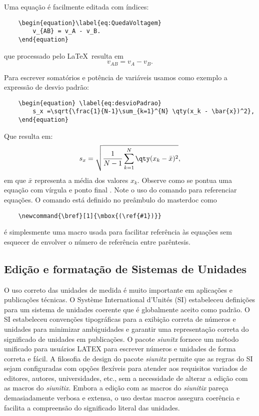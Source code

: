 Uma equação é facilmente editada com índices:
\begin{verbatim}
	\begin{equation}\label{eq:QuedaVoltagem}
		v_{AB} = v_A - v_B. 
	\end{equation}
\end{verbatim}

que processado pelo \LaTeX \, resulta em
\begin{equation}\label{eq:QuedaVoltagem}
	v_{AB} = v_A - v_B. 
\end{equation}

Para escrever  somatórios e potência de variáveis usamos como exemplo a expressão de desvio padrão: 
\begin{verbatim}
	\begin{equation} \label{eq:desvioPadrao}
		s_x =\sqrt{\frac{1}{N-1}\sum_{k=1}^{N} \qty(x_k - \bar{x})^2},
	\end{equation}
\end{verbatim}

Que resulta em:
\begin{equation}\label{eq:desvioPadrao}
	s_x =\sqrt{\frac{1}{N-1}\sum_{k=1}^{N} \qty(x_k - \bar{x})^2},
\end{equation}
em que $\bar{x}$ representa a média dos valores $x_k$. Observe como se pontua uma equação com vírgula  e ponto final . Note o uso do comando  para referenciar equações. O comando   está definido no preâmbulo do masterdoc como
\begin{verbatim}
	\newcommand{\bref}[1]{\mbox{(\ref{#1})}}
\end{verbatim}
é simplesmente  uma macro usada para facilitar referência às equações sem esquecer de envolver o número de referência entre parêntesis. 


\subsection{Edição e formatação de Sistemas de Unidades}

O uso correto das unidades de medida é muito importante em aplicações e publicações técnicas. O Système International d'Unités (SI)  estabeleceu definições para um sistema de unidades coerente que é globalmente aceito como padrão.  O SI estabeleceu convenções tipográficas para a exibição correta de números e unidades  para minimizar ambiguidades e garantir uma representação correta do significado de unidades em publicações.
O pacote \emph{siunitx}  fornece um método unificado para usuários LATEX para escrever números e unidades de forma correta e fácil. A filosofia de design do pacote \emph{siunitx} permite que as regras do SI sejam  configuradas com opções  flexíveis para atender aos requisitos variados de editores, autores, universidades, etc., sem a necessidade de alterar a edição com as macros  do \emph{siunitix}. Embora a edição com as macros do \emph{siunitix} pareça demasiadamente verbosa e extensa, o uso destas macros  assegura coerência e facilita a compreensão do significado literal das unidades. 

